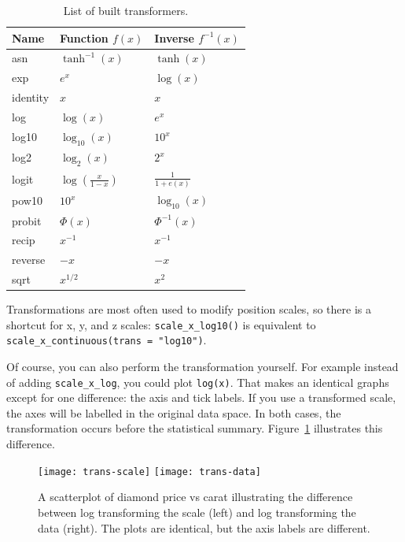 \begin{table}
  \centering
  \begin{tabular}{lll}
    \toprule
    Name & Function $f(x)$ & Inverse $f^{-1}(x)$ \\
    \midrule
    asn       & $\tanh^{-1}(x)$ & $\tanh(x)$ \\
    exp       & $e ^ x$         & $\log(x)$  \\
    identity  & $x$             & $x$        \\
    log       & $\log(x)$       & $e ^ x$    \\
    log10     & $\log_{10}(x)$  & $10 ^ x$   \\
    log2      & $\log_2(x)$     & $2 ^ x$    \\
    logit     & $\log(\frac{x}{1 - x})$ & $\frac{1}{1 + e(x)} $ \\
    pow10     & $10^x$          & $\log_{10}(x) $ \\
    probit    & $\Phi(x)$       & $\Phi^{-1}(x)$ \\
    recip     & $x^{-1}$        & $x^{-1}$ \\
    reverse   & $-x$            & $-x$     \\
    sqrt      & $x^{1/2}$       & $x ^ 2$  \\
    \bottomrule
  \end{tabular}
  \caption{List of built transformers.}
  \label{tbl:common-trans}
\end{table}

Transformations are most often used to modify position scales, so there is a shortcut for x, y, and z scales: \verb|scale_x_log10()| is equivalent to \verb|scale_x_continuous(trans = "log10")|.

Of course, you can also perform the transformation yourself.  For example instead of adding {\tt scale\_x\_log}, you could plot {\tt log(x)}.  That makes an identical graphs except for one difference: the axis and tick labels.  If you use a transformed scale, the axes will be labelled in the original data space. In both cases, the transformation occurs before the statistical summary. Figure~\ref{fig:trans} illustrates this difference.

\begin{figure}[htbp]
  \centering
    \texttt{[image: trans-scale]}%
    \texttt{[image: trans-data]}
  \caption{A scatterplot of diamond price vs carat illustrating the difference between log transforming the scale (left) and log transforming the data (right).  The plots are identical, but the axis labels are different.}
  \label{fig:trans}
\end{figure}

